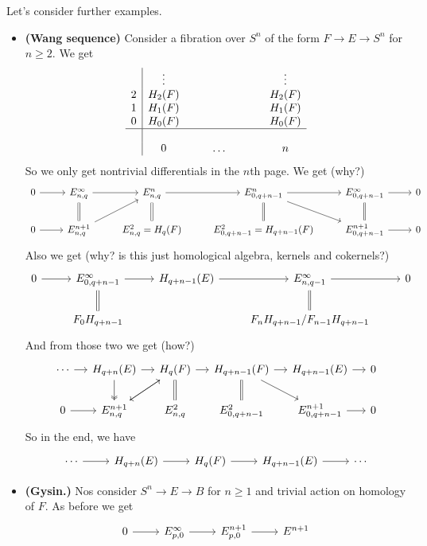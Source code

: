 \documentclass{article}
\begin{document}
Let's consider further examples.
\begin{examples}\leavevmode
	\begin{itemize}
		\item \textbf{(Wang sequence)} Consider a fibration over $S^n$ of the form $F\to E\to S^n$ for $n\geq2$. We get
			\begin{align*}
			\begin{array}{c|cccccccc}
				&\vdots&&&&&&&\vdots\\
				2&H_2(F)&&&&&&&H_2(F)\\
				1&H_1(F)&&&&&&&H_1(F)\\
				0&H_0(F)&&&&&&&H_0(F)\\
				\hline\\
				&0&&&\ldots&&&&n
			\end{array}
		\end{align*}
		So we only get nontrivial differentials in the $n$th page. We get {\color{blue}(why?)}
		\begin{equation*}
			\begin{tikzcd}
			0\arrow[r]&E^\infty_{n,q}\arrow[d,equal]\arrow[r]&E^n_{n,q}\arrow[r]&E^n_{0,q+n-1}\arrow[r]\arrow[dr]&E^\infty_{0,q+n-1}\arrow[r]\arrow[d,equals]&0\\
			0\arrow[r]&E^{n+1}_{n,q}\arrow[ur]&E^2_{n,q}=H_{q}(F)\arrow[u,equal]&E^{2}_{0,q+n-1}=H_{q+n-1}(F)\arrow[u,equal]&E^{n+1}_{0,q+n-1}\arrow[r]&0
		\end{tikzcd}
		\end{equation*}
		Also we get {\color{blue}(why? is this just homological algebra, kernels and cokernels?)}
		\begin{equation}
			\begin{tikzcd}
				0\arrow[r]&E^\infty_{0,q+n-1}\arrow[d,equal]\arrow[r]&H_{q+n-1}(E)\arrow[r]&E^\infty_{n,q-1}\arrow[r]\arrow[d,equal]&0\\
				&F_0H_{q+n-1}&&F_nH_{q+n-1}/F_{n-1}H_{q+n-1}
			\end{tikzcd}
		\end{equation}
			And from those two we get {\color{blue}(how?)}
		\begin{equation}
		\begin{tikzcd}[column sep=small]
			\cdots\arrow[r]&H_{q+n}(E)\arrow[d,two heads]\arrow[r]&H_q(F)\arrow[dl]\arrow[r]&H_{q+n-1}(F)\arrow[r]\arrow[dr]&H_{q+n-1}(E)\arrow[r]&0\\
			0\arrow[r]&E^{n+1}_{n,q}\arrow[ur]&E^2_{n,q}\arrow[u,equal]&E^{2}_{0,q+n-1}\arrow[u,equal]&E^{n+1}_{0,q+n-1}\arrow[r]&0
		\end{tikzcd}
		\end{equation}
		So in the end, we have
		\[\begin{tikzcd}
			\cdots\arrow[r]&H_{q+n}(E)\arrow[r]&H_q(F)\arrow[r]&H_{q+n-1}(E)\arrow[r]&\cdots
		\end{tikzcd}\]
		\item \textbf{(Gysin.)} Nos consider $S^n\to E\to B$ for $n\geq 1$ and trivial action on homology of $F$. As before we get
		\[\begin{tikzcd}
			0\arrow[r]&E^\infty_{p,0}\arrow[r]&E^{n+1}_{p,0}\arrow[r]&E^{n+1}
		\end{tikzcd}\]
	\end{itemize}
\end{examples}
\end{document}
